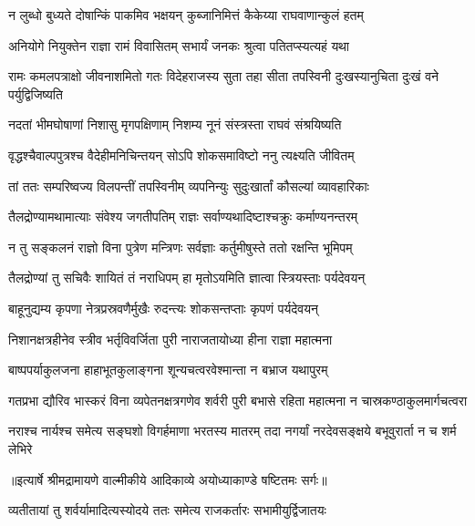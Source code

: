 \twolineshloka
{न लुब्धो बुध्यते दोषान्किं पाकमिव भक्षयन्}
{कुब्जानिमित्तं कैकेय्या राघवाणान्कुलं हतम्} %

\twolineshloka
{अनियोगे नियुक्तेन राज्ञा रामं विवासितम्}
{सभार्यं जनकः श्रुत्वा पतितप्स्यत्यहं यथा} %

\threelineshloka
{रामः कमलपत्राक्षो जीवनाशमितो गतः}
{विदेहराजस्य सुता तहा सीता तपस्विनी}
{दुःखस्यानुचिता दुःखं वने पर्युद्विजिष्यति} %

\twolineshloka
{नदतां भीमघोषाणां निशासु मृगपक्षिणाम्}
{निशम्य नूनं संस्त्रस्ता राघवं संश्रयिष्यति} %

\twolineshloka
{वृद्धश्चैवाल्पपुत्रश्च वैदेहीमनिचिन्तयन्}
{सोऽपि शोकसमाविष्टो ननु त्यक्ष्यति जीवितम्} %

\twolineshloka
{तां ततः सम्परिष्वज्य विलपन्तीं तपस्विनीम्}
{व्यपनिन्युः सुदुःखार्तां कौसल्यां व्यावहारिकाः} %

\twolineshloka
{तैलद्रोण्यामथामात्याः संवेश्य जगतीपतिम्}
{राज्ञः सर्वाण्यथादिष्टाश्चक्रुः कर्माण्यनन्तरम्} %

\twolineshloka
{न तु सङ्कलनं राज्ञो विना पुत्रेण मन्त्रिणः}
{सर्वज्ञाः कर्तुमीषुस्ते ततो रक्षन्ति भूमिपम्} %

\twolineshloka
{तैलद्रोण्यां तु सचिवैः शायितं तं नराधिपम्}
{हा मृतोऽयमिति ज्ञात्वा स्त्रियस्ताः पर्यदेवयन्} %

\twolineshloka
{बाहूनुद्यम्य कृपणा नेत्रप्रस्रवणैर्मुखैः}
{रुदन्त्यः शोकसन्तप्ताः कृपणं पर्यदेवयन्} %

\twolineshloka
{निशानक्षत्रहीनेव स्त्रीव भर्तृविवर्जिता}
{पुरी नाराजतायोध्या हीना राज्ञा महात्मना} %

\twolineshloka
{बाष्पपर्याकुलजना हाहाभूतकुलाङ्गना}
{शून्यचत्वरवेश्मान्ता न बभ्राज यथापुरम्} %

\fourlineindentedshloka
{गतप्रभा द्यौरिव भास्करं विना}
{व्यपेतनक्षत्रगणेव शर्वरी}
{पुरी बभासे रहिता महात्मना}
{न चास्रकण्ठाकुलमार्गचत्वरा} %

\fourlineindentedshloka
{नराश्च नार्यश्च समेत्य सङ्घशो}
{विगर्हमाणा भरतस्य मातरम्}
{तदा नगर्यां नरदेवसङ्क्षये}
{बभूवुरार्ता न च शर्म लेभिरे} %


{॥इत्यार्षे श्रीमद्रामायणे वाल्मीकीये आदिकाव्ये अयोध्याकाण्डे षष्टितमः सर्गः॥}


\twolineshloka
{व्यतीतायां तु शर्वर्यामादित्यस्योदये ततः}
{समेत्य राजकर्तारः सभामीयुर्द्विजातयः} %

